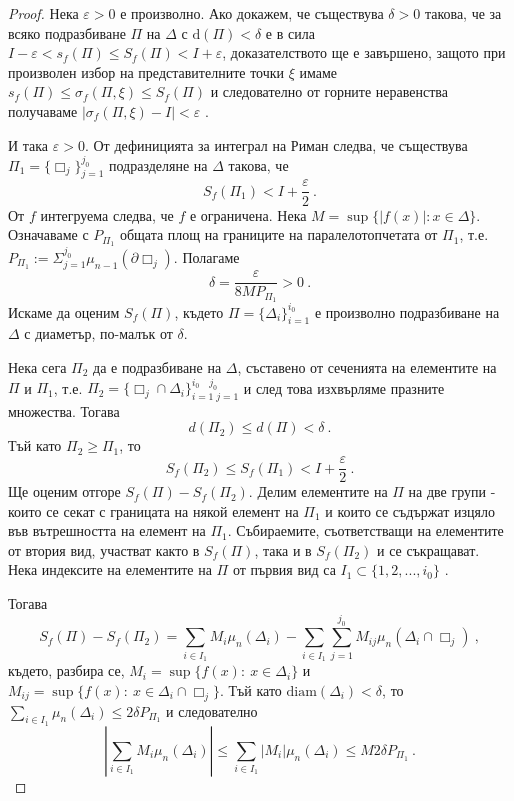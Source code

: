 \documentclass[11pt]{article}
\numberwithin{equation}{section}
\numberwithin{figure}{section}
\numberwithin{table}{section}
\theoremstyle{plain}
\theoremstyle{definition}
\theoremstyle{remark}
\theoremstyle{definition}
\theoremstyle{remark}
\theoremstyle{plain}
\theoremstyle{definition}
\theoremstyle{definition}
\theoremstyle{plain}
\theoremstyle{plain}
\theoremstyle{plain}
\theoremstyle{definition}
\theoremstyle{plain}
\begin{document}
\begin{proof}
Нека $\varepsilon > 0$ е произволно. Ако докажем, че съществува $\delta >0$ такова, че за всяко подразбиване $\Pi$ на $\Delta$ с $\textrm{d}(\Pi)<\delta$ е в сила $I-\varepsilon < s_f(\Pi) \leq S_f(\Pi) < I+\varepsilon$, доказателството ще е завършено, защото при произволен избор на представителните точки $\xi$ имаме
$s_f(\Pi) \leq \sigma_f(\Pi, \xi) \leq S_f(\Pi)$
и следователно от горните неравенства получаваме $|\sigma_f(\Pi, \xi) - I|<\varepsilon$ .

И така $\varepsilon > 0$. От дефиницията за интеграл на Риман следва, че съществува $\Pi_1 = \{\Box_j \}_{j=1}^{j_0}$ подразделяне на $\Delta$ такова, че
$$S_f(\Pi_1) < I+\frac{\varepsilon}{2} \ .$$
От $f$ интегруема следва, че $f$ е  ограничена. Нека $M = \sup\{|f(x)|: x\in\Delta\}$. Означаваме с  $P_{\Pi_1}$  общата площ на границите на паралелотопчетата от $\Pi_1$, т.е.
$P_{\Pi_1}:= \Sigma_{j=1}^{j_0} \mu_{n-1}\left(\partial \Box_j\right)$. Полагаме $$\delta = \frac{\varepsilon}{8MP_{\Pi_1}}>0 \ .$$  Искаме да оценим $S_f(\Pi)$, където $\Pi =\{\Delta_i \}_{i=1}^{i_0}$ е произволно подразбиване на $\Delta$ с диаметър, по-малък от $\delta$.

Нека сега $\Pi_2$ да е подразбиване на $\Delta$, съставено от сеченията на елементите на $\Pi$ и $\Pi_1$, т.е. $\Pi_2 = \{\Box_j \cap \Delta_i \}_{i=1 \; j=1}^{i_0 \quad j_0}$ и след това изхвърляме празните множества. Тогава $$d(\Pi_2) \leq d(\Pi) < \delta \ .$$ Тъй като $\Pi_2 \ge \Pi_1$, то $$S_f(\Pi_2) \leq S_f(\Pi_1) < I + \frac{\varepsilon}{2} \ .$$  Ще оценим отгоре $S_f(\Pi) - S_f(\Pi_2)$. Делим елементите на $\Pi$ на две групи - които се секат с границата на някой елемент на $\Pi_1$ и които се съдържат изцяло във вътрешността на елемент на $\Pi_1$. Събираемите, съответстващи на елементите от втория вид, участват както в $S_f(\Pi)$, така и в $S_f(\Pi_2)$ и се съкращават. Нека индексите на елементите на $\Pi$ от първия вид са $I_1 \subset \{1, 2, ..., i_0 \}$ .

Тогава
\begin{dmath*}
S_f(\Pi) - S_f(\Pi_2) = \sum_{i\in I_1} M_i \mu_n (\Delta_i) - \sum_{i\in I_1} \sum_{j=1}^{j_0} M_{ij} \mu_n (\Delta_i\cap \Box_j) \ ,
\end{dmath*}
където, разбира се, $M_i=\sup\{ f(x): \ x\in \Delta_i\}$ и $M_{ij}=\sup\{ f(x): \ x\in \Delta_i\cap \Box_j\}$. Тъй като
$\textrm{diam}(\Delta_i)<\delta$, то $\sum_{i\in I_1} \mu_n (\Delta_i) \leq 2 \delta P_{\Pi_1}$ и следователно $$\left|\sum_{i\in I_1} M_i \mu_n (\Delta_i)\right|\leq \sum_{i\in I_1} \left| M_i\right| \mu_n (\Delta_i) \le M 2 \delta P_{\Pi_1} \ .$$


\end{proof}
\end{document}
